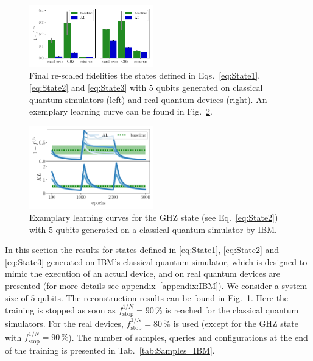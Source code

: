 \documentclass[pra,aps,showpacs,groupedaddress,superscriptaddress,twocolumn,toc=flat,biblatex,footinbib]{revtex4-1}
\begin{document}
\begin{figure}[t]
	\centering
  \includegraphics[width=0.48\textwidth]{Paper/Graphics/rescaled_fidelity.pdf}
	\caption[]{Final re-scaled fidelities the states defined in Eqs.~\eqref{eq:State1}, \eqref{eq:State2} and \eqref{eq:State3} with $5$ qubits generated on classical quantum simulators (left) and real quantum devices (right). An exemplary learning curve can be found in Fig.~\ref{fig:Example_GHZIBMclassical}.}
	\label{fig:IBM}
\end{figure}

\begin{figure}[t]
	\centering
  \includegraphics[width=0.48\textwidth]{Paper/Graphics/classical_GHZ.pdf}
	\caption[]{Examplary learning curves for the GHZ state (see Eq.~\eqref{eq:State2}) with $5$ qubits generated on a classical quantum simulator by IBM.}
	\label{fig:Example_GHZIBMclassical}
\end{figure}

In this section the results for states defined in \eqref{eq:State1}, \eqref{eq:State2} and \eqref{eq:State3} generated on IBM's classical quantum simulator, which is designed to  mimic the execution of an actual device, and on real quantum devices are presented (for more details see appendix~\ref{appendix:IBM}). We consider a system size of $5$ qubits. The reconstruction results can be found in Fig.~\ref{fig:IBM}. Here the training is stopped as soon as $f^{1/N}_{\mathrm{stop}}=90\,\%$ is reached for the classical quantum simulators. For the real devices, $f^{1/N}_{\mathrm{stop}}=80\,\%$ is used (except for the GHZ state with $f^{1/N}_{\mathrm{stop}}=90\,\%$). The number of samples, queries and configurations at the end of the training is presented in Tab.~\ref{tab:Samples_IBM}.
\end{document}
